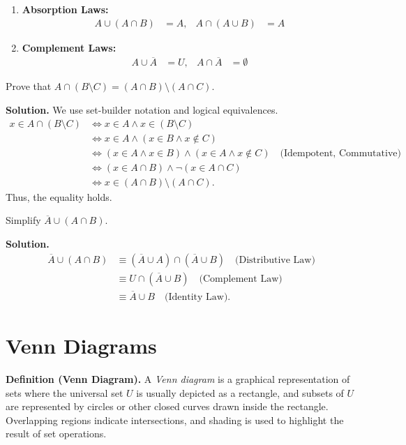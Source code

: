 \documentclass[11pt,a4paper]{article}
\begin{document}
\begin{enumerate}[label=\textbf{\arabic*.}, leftmargin=*]
    \item \textbf{Absorption Laws:}
    \begin{align*}
        A \cup (A \cap B) &= A, & A \cap (A \cup B) &= A
    \end{align*}
    
    \item \textbf{Complement Laws:}
    \begin{align*}
        A \cup \overline{A} &= U, & A \cap \overline{A} &= \emptyset
    \end{align*}
\end{enumerate}

\begin{example}
Prove that $A \cap (B \setminus C) = (A \cap B) \setminus (A \cap C)$.

\textbf{Solution.} We use set-builder notation and logical equivalences.
\begin{align*}
    x \in A \cap (B \setminus C) &\iff x \in A \land x \in (B \setminus C) \\
    &\iff x \in A \land (x \in B \land x \notin C) \\
    &\iff (x \in A \land x \in B) \land (x \in A \land x \notin C) \quad \text{(Idempotent, Commutative)} \\
    &\iff (x \in A \cap B) \land \neg(x \in A \cap C) \\
    &\iff x \in (A \cap B) \setminus (A \cap C).
\end{align*}
Thus, the equality holds.
\end{example}

\begin{example}
Simplify $\overline{A} \cup (A \cap B)$.

\textbf{Solution.}
\begin{align*}
    \overline{A} \cup (A \cap B) &\equiv (\overline{A} \cup A) \cap (\overline{A} \cup B) \quad \text{(Distributive Law)} \\
    &\equiv U \cap (\overline{A} \cup B) \quad \text{(Complement Law)} \\
    &\equiv \overline{A} \cup B \quad \text{(Identity Law)}.
\end{align*}
\end{example}

\section{Venn Diagrams}

\textbf{Definition (Venn Diagram).} A \textit{Venn diagram} is a graphical representation of sets where the universal set $U$ is usually depicted as a rectangle, and subsets of $U$ are represented by circles or other closed curves drawn inside the rectangle. Overlapping regions indicate intersections, and shading is used to highlight the result of set operations.
\end{document}
